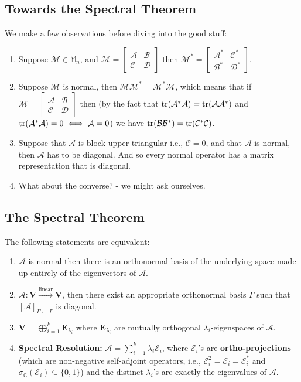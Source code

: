 \documentclass{article}
\theoremstyle{definition}
\newcommand{\C}{\mathbb{C}}
\newcommand{\V}{\mathbf{V}}
\newcommand{\A}{\mathcal{A}}
\newcommand{\B}{\mathcal{B}}
\newcommand{\M}{\mathcal{M}}
\newcommand{\E}{\mathcal{E}}
\newcommand{\lin}{\overset{\text{linear}}{\longrightarrow}}
\begin{document}
\subsection{Towards the Spectral Theorem}
We make a few observations before diving into the good stuff:
\begin{enumerate}
	\item Suppose $\M \in \mathbb{M}_n$, and $\M = \begin{bmatrix}
	\A & \B \\ \mathcal{C} & \mathcal{D}
	\end{bmatrix}$ then $\M^* = \begin{bmatrix}
	\A^* & \mathcal{C}^* \\ \B^* & \mathcal{D}^*
	\end{bmatrix}$. 
	
	\item Suppose $\M$ is normal, then $\M\M^* = \M^* \M$, which means that if $\M = \begin{bmatrix}
	\A & \B \\ \mathcal{C} & \mathcal{D}
	\end{bmatrix}$ 
	then (by the fact that $\tr(\A^*\A) = \tr(\A\A^*)$ and $\tr(\A^*\A) = 0 \iff \A=0$) we have $\tr(\B\B^*) = \tr(\mathcal{C}^*\mathcal{C})$.
	
	\item Suppose that $\A$ is block-upper triangular i.e., $\mathcal{C} = 0$, and that $\A$ is normal, then $\A$ has to be diagonal. And so every normal operator has a matrix representation that is diagonal. 
	
	\item What about the converse? - we might ask ourselves. 
\end{enumerate}



\subsection{The Spectral Theorem}

The following statements are equivalent:
\begin{enumerate}
	\item $\A$ is normal then there is an orthonormal basis of the underlying space made up entirely of the eigenvectors of $\A$.
	\item $\A: \V \lin \V$, then there exist an appropriate orthonormal basis $\Gamma$ such that $[\A]_{\Gamma\leftarrow\Gamma}$ is diagonal.
	\item $\V = \bigoplus_{i=1}^k \mathbf{E}_{\lambda_i}$ where $\mathbf{E}_{\lambda_i}$ are mutually orthogonal $\lambda_i$-eigenspaces of $\A$. 
	\item \textbf{Spectral Resolution:} $\A = \sum^k_{i=1}\lambda_i\E_i$, where $\E_i$'s are \textbf{ortho-projections} (which are non-negative self-adjoint operators, i.e., $\E_i^2 = \E_i = \E_i^*$ and $\sigma_\C(\E_i) \subseteq \{0,1 \}$) and the distinct $\lambda_i$'s are exactly the eigenvalues of $\A$. 
\end{enumerate}
\end{document}
